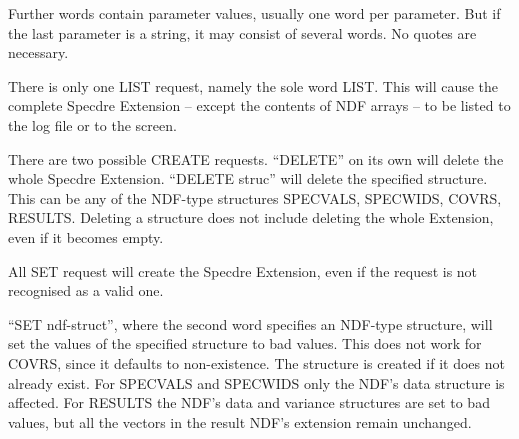 {{      Further words contain parameter values, usually one word per
      parameter. But if the last parameter is a string, it may
      consist of several words. No quotes are necessary.

      There is only one LIST request, namely the sole word LIST. This
      will cause the complete Specdre Extension -- except the contents of
      NDF arrays -- to be listed to the log file or to the screen.

      There are two possible CREATE requests.
      ``DELETE'' on its own will delete the whole Specdre Extension.
      ``DELETE struc'' will delete the specified structure. This can be
      any of the NDF-type structures SPECVALS, SPECWIDS, COVRS, RESULTS.
      Deleting a structure does not include deleting the whole
      Extension, even if it becomes empty.

      All SET request will create the Specdre Extension, even if the
      request is not recognised as a valid one.

      ``SET ndf-struct'', where the second word specifies an NDF-type
      structure, will set the values of the specified structure to
      bad values. This does not work for COVRS, since it defaults to
      non-existence. The structure is created if it does not already
      exist. For SPECVALS and SPECWIDS only the NDF's data structure
      is affected. For RESULTS the NDF's data and variance structures
      are set to bad values, but all the vectors in the result NDF's
      extension remain unchanged.
      \sstitemlist{

}}}
